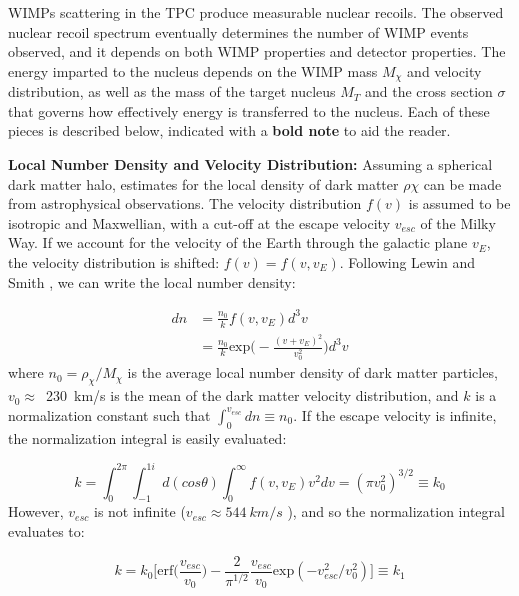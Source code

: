 \ac{WIMP}s scattering in the \ac{TPC} produce measurable nuclear recoils. The observed nuclear recoil spectrum eventually determines the number of \ac{WIMP} events observed, and it depends on both \ac{WIMP} properties and detector properties. The energy imparted to the nucleus depends on the \ac{WIMP} mass $M_{\chi}$ and velocity distribution, as well as the mass of the target nucleus $M_{T}$ and the cross section $\sigma$ that governs how effectively energy is transferred to the nucleus. Each of these pieces is described below, indicated with a \textbf{bold note} to aid the reader.

\textbf{Local Number Density and Velocity Distribution:} Assuming a spherical dark matter halo, estimates for the local density of dark matter $\rho{\chi}$ can be made from astrophysical observations. The velocity distribution $f(v)$ is assumed to be isotropic and Maxwellian, with a cut-off at the escape velocity $v_{esc}$ of the Milky Way. If we account for the velocity of the Earth through the galactic plane $v_{E}$, the velocity distribution is shifted: $f(v) = f(v,v_{E})$. Following Lewin and Smith \cite{Lewin1996}, we can write the local number density:


\begin{equation}
\begin{split}
dn &= \frac{n_{0}}{k} f(v, v_{E}) d^{3}v \\
     &= \frac{n_{0}}{k} \mathrm{exp} \Big( - \frac{(v + v_{E})^{2} }{ v_{0}^{2}} \Big) d^{3}v 
\end{split}
\end{equation}
where $n_{0} = \rho_{\chi}/M_{\chi}$ is the average local number density of dark matter particles, $v_{0} \approx$~230~km/s \cite{Lewin1996} is the mean of the dark matter velocity distribution, and $k$ is a normalization constant such that $\int_{0}^{v_{esc}} dn \equiv n_{0}$. If the escape velocity is infinite, the normalization integral is easily evaluated:

\begin{equation}
k = \int_{0}^{2\pi} \int_{-1}^{1i} d(cos\theta)  \int_{0}^{\infty} f(v, v_{E}) v^{2}dv = (\pi v_{0}^{2})^{3/2} \equiv k_{0}
\end{equation}
However, $v_{esc}$ is not infinite ($v_{esc} \approx 544~km/s$ \cite{Baudis2014}), and so the normalization integral evaluates to:

\begin{equation}
k =  k_{0} \Big[ \mathrm{erf}\big(\frac{v_{esc}}{v_{0}}\big) - \frac{2}{\pi^{1/2}} \frac{v_{esc}}{v_{0}} \mathrm{exp}(- v_{esc}^{2} / v_{0}^{2} ) \Big]  \equiv k_{1}
\end{equation}

